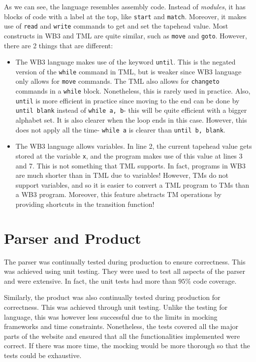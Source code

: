 As we can see, the language resembles assembly code. Instead of \textit{modules}, it has blocks of code with a label at the top, like \texttt{start} and \texttt{match}. Moreover, it makes use of \texttt{read} and \texttt{write} commands to get and set the tapehead value. Most constructs in WB3 and TML are quite similar, such as \texttt{move} and \texttt{goto}. However, there are 2 things that are different:
\begin{itemize}
    \item The WB3 language makes use of the keyword \texttt{until}. This is the negated version of the \texttt{while} command in TML, but is weaker since WB3 language only allows for \texttt{move} commands. The TML also allows for \texttt{changeto} commands in a \texttt{while} block. Nonetheless, this is rarely used in practice. Also, \texttt{until} is more efficient in practice since moving to the end can be done by \texttt{until blank} instead of \texttt{while a, b}- this will be quite efficient with a bigger alphabet set. It is also clearer when the loop ends in this case. However, this does not apply all the time- \texttt{while a} is clearer than \texttt{until b, blank}.
    
    \item The WB3 language allows variables. In line 2, the current tapehead value gets stored at the variable \texttt{x}, and the program makes use of this value at lines 3 and 7. This is not something that TML supports. In fact, programs in WB3 are much shorter than in TML due to variables! However, TMs do not support variables, and so it is easier to convert a TML program to TMs than a WB3 program. Moreover, this feature abstracts TM operations by providing shortcuts in the transition function!
\end{itemize}

\section{Parser and Product}
The parser was continually tested during production to ensure correctness. This was achieved using unit testing. They were used to test all aspects of the parser and were extensive. In fact, the unit tests had more than $95\%$ code coverage.

Similarly, the product was also continually tested during production for correctness. This was achieved through unit testing. Unlike the testing for language, this was however less successful due to the limits in mocking frameworks and time constraints. Nonetheless, the tests covered all the major parts of the website and ensured that all the functionalities implemented were correct. If there was more time, the mocking would be more thorough so that the tests could be exhaustive.

